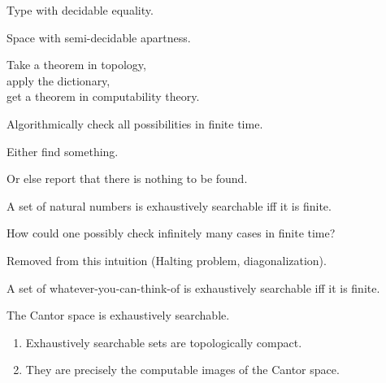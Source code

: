 \documentclass%
[%
Screen4to3,
]{foils}
\newcommand{\db}{\darkblue}
\begin{document}
 Type with decidable equality.

 Space with semi-decidable apartness.

\vfill
\noindent
Take a theorem in topology, \\
apply the dictionary, \\
get a theorem in computability theory. 

\vfill




Algorithmically check all possibilities in finite time.

\qquad Either find something.

\qquad Or else report that there is nothing to be found.

\vfill

A set of natural numbers is exhaustively searchable iff it is finite.

\vfill

How could one possibly check infinitely many cases in finite time?

 Removed from this intuition (Halting problem, diagonalization).



A set of whatever-you-can-think-of is exhaustively searchable iff it is finite.




 The Cantor space  is
exhaustively searchable.

\vfill

\db{Theorem}
\begin{enumerate}
\item Exhaustively searchable sets are topologically compact.
\item They are precisely the computable images of the Cantor space.
\end{enumerate}

\vfill




\end{document}
